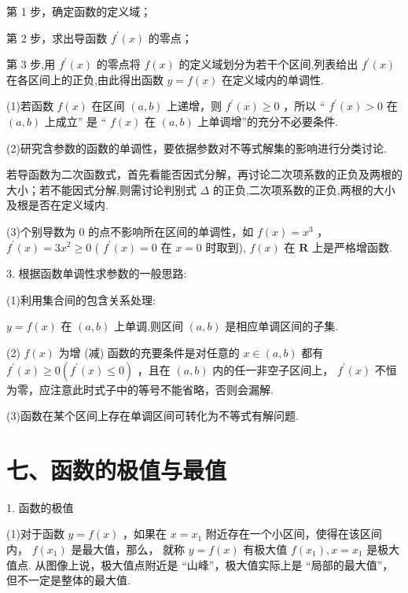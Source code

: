 第 1 步，确定函数的定义域；

第 2 步，求出导函数 ${f}^{\prime }\left( x\right)$ 的零点；

第 3 步,用 ${f}^{\prime }\left( x\right)$ 的零点将 $f\left( x\right)$ 的定义域划分为若干个区间,列表给出 ${f}^{\prime }\left( x\right)$ 在各区间上的正负,由此得出函数 $y = f\left( x\right)$ 在定义域内的单调性.

(1)若函数 $f\left( x\right)$ 在区间 $\left( {a,b}\right)$ 上递增，则 ${f}^{\prime }\left( x\right)  \geq  0$ ，所以 “ ${f}^{\prime }\left( x\right)  > 0$ 在 $\left( {a,b}\right)$ 上成立” 是 “ $f\left( x\right)$ 在 $\left( {a,b}\right)$ 上单调增”的充分不必要条件.

(2)研究含参数的函数的单调性，要依据参数对不等式解集的影响进行分类讨论.

若导函数为二次函数式，首先看能否因式分解，再讨论二次项系数的正负及两根的大小；若不能因式分解,则需讨论判别式 $\Delta$ 的正负,二次项系数的正负,两根的大小及根是否在定义域内.

(3)个别导数为 0 的点不影响所在区间的单调性，如 $f\left( x\right)  = {x}^{3}$ ， ${f}^{\prime }\left( x\right)  = 3{x}^{2} \geq  0$ ( ${f}^{\prime }\left( x\right)  = 0$ 在 $x = 0$ 时取到), $f\left( x\right)$ 在 $\mathbf{R}$ 上是严格增函数.

3. 根据函数单调性求参数的一般思路:

(1)利用集合间的包含关系处理:

$y = f\left( x\right)$ 在 $\left( {a,b}\right)$ 上单调,则区间 $\left( {a,b}\right)$ 是相应单调区间的子集.

(2) $f\left( x\right)$ 为增 (减) 函数的充要条件是对任意的 $x \in  \left( {a,b}\right)$ 都有 ${f}^{\prime }\left( x\right)  \geq  0\left( {{f}^{\prime }\left( x\right)  \leq  0}\right)$ ，且在 $\left( {a,b}\right)$ 内的任一非空子区间上， ${f}^{\prime }\left( x\right)$ 不恒为零，应注意此时式子中的等号不能省略，否则会漏解.

(3)函数在某个区间上存在单调区间可转化为不等式有解问题.

\section*{七、函数的极值与最值}

1. 函数的极值

(1)对于函数 $y = f\left( x\right)$ ，如果在 $x = {x}_{1}$ 附近存在一个小区间，使得在该区间内， $f\left( {x}_{1}\right)$ 是最大值，那么， 就称 $y = f\left( x\right)$ 有极大值 $f\left( {x}_{1}\right) ,x = {x}_{1}$ 是极大值点. 从图像上说，极大值点附近是 “山峰”，极大值实际上是 “局部的最大值”，但不一定是整体的最大值.

